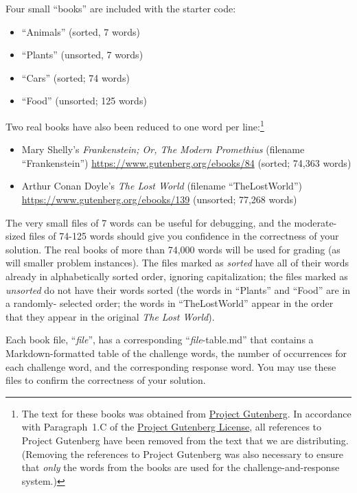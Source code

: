 Four small ``books'' are included with the starter code:

\begin{itemize}
\item ``Animals'' (sorted, 7 words)
\item ``Plants'' (unsorted, 7 words)
\item ``Cars'' (sorted; 74 words)
\item ``Food'' (unsorted; 125 words)
\end{itemize}

Two real books have also been reduced to one word per line:\footnote{The text
for these books was obtained from \href{http://www.gutenberg.org/}{Project
Gutenberg}. In accordance with Paragraph~1.C of the
\href{http://www.gutenberg.org/policy/license}{Project Gutenberg License}, all
references to Project Gutenberg have been removed from the text that we are
distributing. (Removing the references to Project Gutenberg was also necessary
to ensure that \textit{only} the words from the books are used for the
challenge-and-response system.)}

\begin{itemize}
\item Mary Shelly's \textit{Frankenstein; Or, The Modern Promethius} (filename
    ``Frankenstein'') \url{https://www.gutenberg.org/ebooks/84} (sorted; 74,363
    words)
\item Arthur Conan Doyle's \textit{The Lost World} (filename ``TheLostWorld'')
    \url{https://www.gutenberg.org/ebooks/139} (unsorted; 77,268 words)
\end{itemize}

The very small files of 7 words can be useful for debugging, and the moderate-
sized files of 74-125 words should give you confidence in the correctness of
your solution. The real books of more than 74,000 words will be used for
grading (as will smaller problem instances). The files marked as
\textit{sorted} have all of their words already in alphabetically sorted order,
ignoring capitalization; the files marked as \textit{unsorted} do not have
their words sorted (the words in ``Plants'' and ``Food'' are in a randomly-
selected order; the words in ``TheLostWorld'' appear in the order that they
appear in the original \textit{The Lost World}).

Each book file, ``\textit{file}'', has a corresponding
``\textit{file}-table.md'' that contains a Markdown-formatted table of the
challenge words, the number of occurrences for each challenge word, and the
corresponding response word. You may use these files to confirm the correctness
of your solution.

